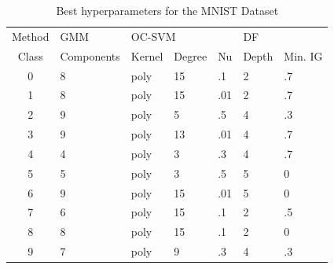 \documentclass[10pt]{article}
\begin{document}
\begin{table}[H]
    \centering
    \begin{tabular}{c|l|lll|ll}
    \toprule
    Method & \gls{GMM} & \multicolumn{3}{l|}{\gls{OC-SVM}} & \multicolumn{2}{l}{\acrlong{DF}} \\ 
    Class & Components & Kernel & Degree & Nu & Depth & Min. \gls{IG} \\\midrule
    0 & 8 & poly & 15 & .1  & 2 & .7  \\
    1 & 8 & poly & 15 & .01 & 2 & .7  \\
    2 & 9 & poly & 5  & .5  & 4 & .3  \\
    3 & 9 & poly & 13 & .01 & 4 & .7  \\
    4 & 4 & poly & 3  & .3  & 4 & .7  \\
    5 & 5 & poly & 3  & .5  & 5 &  0  \\
    6 & 9 & poly & 15 & .01 & 5 &  0  \\
    7 & 6 & poly & 15 & .1  & 2 & .5  \\
    8 & 8 & poly & 15 & .1  & 2 & 0   \\
    9 & 7 & poly & 9  & .3  & 4 & .3  \\ \bottomrule
    \end{tabular}
    \caption{Best hyperparameters for the \gls{MNIST} Dataset}
    \label{table:hyperparameters-results-mnist}
\end{table}
\end{document}

